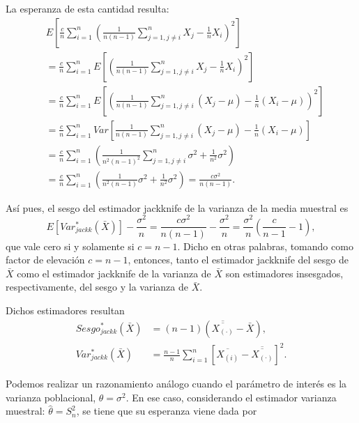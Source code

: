 \documentclass[]{book}
\theoremstyle{definition}
\theoremstyle{definition}
\theoremstyle{definition}
\theoremstyle{remark}
\begin{document}
La esperanza de esta cantidad resulta: \[\begin{aligned}
&E\left[ \frac{c}{n}\sum_{i=1}^{n}\left( \frac{1}{n\left( n-1 \right)}
\sum_{j=1,j\neq i}^{n}X_j-\frac{1}{n}X_i \right)^2\right] \\
&= \frac{c}{n}\sum_{i=1}^{n}E\left[ \left( \frac{1}{n\left( n-1 \right)}
\sum_{j=1,j\neq i}^{n}X_j-\frac{1}{n}X_i \right)^2\right] \\
&= \frac{c}{n}\sum_{i=1}^{n}E\left[ \left( \frac{1}{n\left( n-1 \right)}
\sum_{j=1,j\neq i}^{n}\left( X_j-\mu \right) 
-\frac{1}{n}\left( X_i-\mu \right) \right)^2\right] \\
&= \frac{c}{n}\sum_{i=1}^{n}Var\left[ \frac{1}{n\left( n-1 \right)}
\sum_{j=1,j\neq i}^{n}\left( X_j-\mu \right) 
-\frac{1}{n}\left( X_i-\mu \right) \right]\\
&= \frac{c}{n}\sum_{i=1}^{n}\left( \frac{1}{n^2\left( n-1 \right)^2}
\sum_{j=1,j\neq i}^{n}\sigma^2+\frac{1}{n^2}\sigma^2 \right) \\
&= \frac{c}{n}\sum_{i=1}^{n}\left( \frac{1}{n^2\left( n-1 \right)}\sigma^2+\frac{1}{n^2}\sigma^2 \right) 
=\frac{c\sigma^2}{n\left(n-1 \right)}.
\end{aligned}\]

Así pues, el sesgo del estimador jackknife de la varianza de la media
muestral es
\[E\left[ Var_{jackk}^{\ast}\left( \bar{X} \right) \right] -\frac{\sigma
^2}{n}=\frac{c\sigma^2}{n\left( n-1 \right)}-\frac{\sigma^2}{n}=
\frac{\sigma^2}{n}\left( \frac{c}{n-1}-1 \right),\] que vale cero si y
solamente si \(c=n-1\). Dicho en otras palabras, tomando como factor de
elevación \(c=n-1\), entonces, tanto el estimador jackknife del sesgo de
\(\bar{X}\) como el estimador jackknife de la varianza de \(\bar{X}\)
son estimadores insesgados, respectivamente, del sesgo y la varianza de
\(\bar{X}\).

Dichos estimadores resultan\[\begin{aligned}
Sesgo_{jackk}^{\ast}\left( \bar{X} \right) &= \left( n-1 \right) \left( 
\overline{\overline{X_{(\cdot)}}}-\bar{X} \right), \\
Var_{jackk}^{\ast}\left( \bar{X} \right) &= \frac{n-1}{n}\sum_{i=1}^{n}
\left[ \overline{X_{(i)}}-\overline{\overline{X_{\left( \cdot
 \right)}}}\right]^2.\end{aligned}\]

Podemos realizar un razonamiento análogo cuando el parámetro de interés
es la varianza poblacional, \(\theta =\sigma^2\). En ese caso,
considerando el estimador varianza muestral: \(\hat{\theta}=S_n^2\), se
tiene que su esperanza viene dada por
\end{document}
